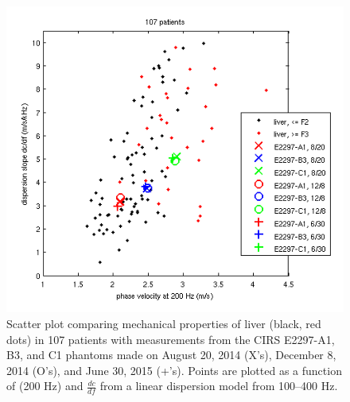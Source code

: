 \begin{figure}[htb!]
    \centering
    \includegraphics[width=0.75\linewidth]{figs/phantom_liver_scatter_plot.png}
    \caption{Scatter plot comparing mechanical properties of liver (black, red
        dots) in 107 patients with measurements from the CIRS E2297-A1, B3, and
        C1 phantoms made on August 20, 2014 (X’s), December 8, 2014 (O’s), and
        June 30, 2015 (+’s). Points are plotted as a function of (200 Hz) and
        $\frac{dc}{df}$ from a linear dispersion model from 100--400 Hz.}
\label{fig:phantom_liver_scatter_plot}
\end{figure}
